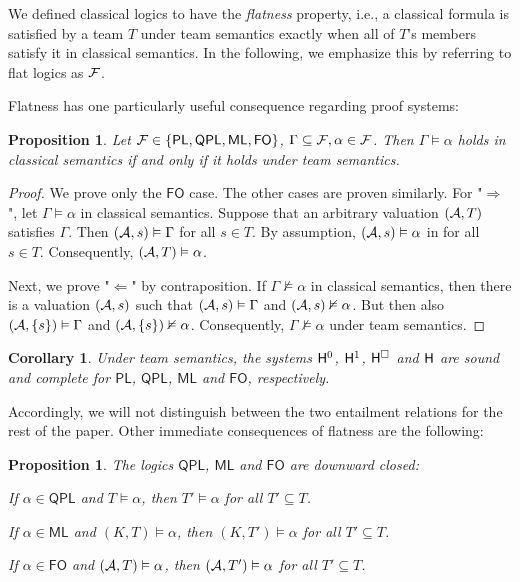 \documentclass[a4paper,english,fleqn,11pt,final]{scrartcl}
\makeatletter
\newcommand{\ie}{i.e.\@\xspace}
\newcommand{\logic}[1]{\ensuremath{\mathsf{#1}}\xspace}
\newcommand{\PL}{\logic{PL}}
\newcommand{\QPL}{\logic{QPL}}
\newcommand{\ML}{\logic{ML}}
\newcommand{\FO}{\logic{FO}}
\newcommand{\calA}{\protect\ensuremath{\mathcal{A}}}
\newcommand{\calF}{\protect\ensuremath{\mathcal{F}}}
\newcommand{\sfH}{\protect\ensuremath{\mathsf{H}}}
\theoremstyle{plain}
\newtheorem{proposition}[theorem]{Proposition}
\newtheorem{corollary}[theorem]{Corollary}
\theoremstyle{definition}
\makeatother
\begin{document}
We defined classical logics to have the \emph{flatness} property, \ie, a classical formula is satisfied by a team $T$ under team semantics exactly when all of $T$'s members satisfy it in classical semantics.
In the following, we emphasize this by referring to flat logics as $\calF$.


Flatness has one particularly useful consequence regarding proof systems:

\begin{proposition}\label{prop:equal-semantics}
Let $\calF \in \{ \PL, \QPL, \ML, \FO\}$, $\Gamma \subseteq \calF, \alpha \in \calF$.
Then $\Gamma \vDash \alpha$ holds in classical semantics if and only if it holds under team semantics.
\end{proposition}
\begin{proof}
We prove only the $\FO$ case.
The other cases are proven similarly.
For "$\Rightarrow$", let $\Gamma \vDash \alpha$ in classical semantics.
Suppose that an arbitrary valuation $(\calA, T)$ satisfies $\Gamma$.
Then $(\calA, s)\vDash \Gamma$ for all $s\in T$.
By assumption, $(\calA, s) \vDash \alpha$ in for all $s\in T$.
Consequently, $(\calA, T)\vDash \alpha$.

Next, we prove "$\Leftarrow$" by contraposition.
If $\Gamma \nvDash \alpha$ in classical semantics, then there is a valuation $(\calA,s)$ such that $(\calA,s)\vDash \Gamma$ and $(\calA,s)\nvDash \alpha$.
But then also $(\calA,\{s\}) \vDash \Gamma$ and $(\calA,\{s\}) \nvDash \alpha$.
Consequently, $\Gamma \nvDash \alpha$ under team semantics.
\end{proof}

\begin{corollary}\label{cor:base-completeness-team}
Under team semantics, the systems $\sfH^0$, $\sfH^1$, $\sfH^\Box$ and $\sfH$ are sound and complete for $\PL$, $\QPL$, $\ML$ and $\FO$, respectively.
\end{corollary}

Accordingly, we will not distinguish between the two entailment relations for the rest of the paper. Other immediate consequences of flatness are the following:

\begin{proposition}\label{prop:downward-closure}
The logics $\QPL$, $\ML$ and $\FO$ are \emph{downward closed}:

If $\alpha \in \QPL$ and $T \vDash \alpha$, then $T' \vDash \alpha$ for all $T' \subseteq T$.

If $\alpha \in \ML$ and $(K,T) \vDash \alpha$, then $(K,T') \vDash \alpha$ for all $T' \subseteq T$.

If $\alpha \in \FO$ and $(\calA,T) \vDash \alpha$, then $(\calA,T') \vDash \alpha$ for all $T' \subseteq T$.
\end{proposition}
\end{document}
